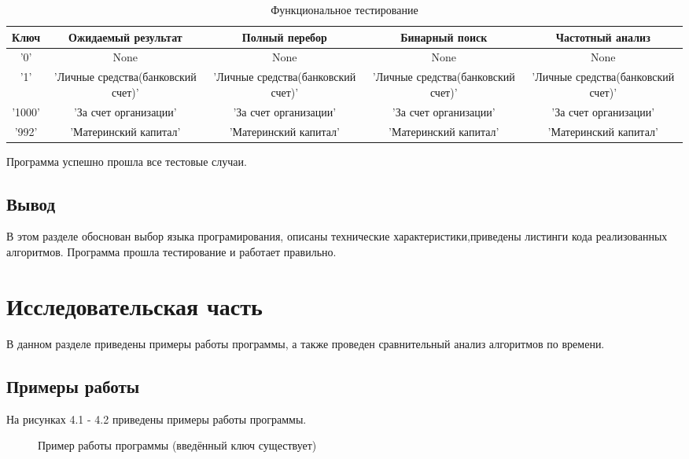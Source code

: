\documentclass[12pt]{report}
\begin{document}
\newpage
\begin{table}
	\caption{Функциональное тестирование}
	\label{tab1}
		\begin{tabular*}{1.75\textwidth}{| c | c | c |c  |c|}
			\hline
			\textbf{Ключ} & \textbf{Ожидаемый результат} & \textbf{Полный перебор} & \textbf{Бинарный поиск} & \textbf{Частотный анализ} \\ \hline
			'0' & 
			None &
			None &
			None &
			None  \\ \hline
			
			'1' & 
			{'Личные средства(банковский счет)'} &
			{'Личные средства(банковский счет)'} &
			{'Личные средства(банковский счет)'} &
			{'Личные средства(банковский счет)'}  \\ \hline	
			
			'1000' &
			{'За счет организации'} &
			{'За счет организации'} &
			{'За счет организации'} &
			{'За счет организации'}  \\ \hline	
			
			'992' &
			{'Материнский капитал'} &
			{'Материнский капитал'} &
			{'Материнский капитал'} &
			{'Материнский капитал'}  \\ \hline	
			
		\end{tabular*}	
		\hfill
		
\end{table}	

Программа успешно прошла все тестовые случаи.

\section{Вывод}
В этом разделе обоснован выбор языка програмирования, описаны технические характеристики,приведены листинги кода реализованных алгоритмов. Программа прошла тестирование и работает правильно.

\chapter{Исследовательская часть}

В данном разделе приведены примеры работы программы, а также проведен сравнительный анализ алгоритмов по времени.
\section{Примеры работы}
На рисунках 4.1 - 4.2 приведены примеры работы программы. 

\begin{figure}[ht!]
	\caption{Пример работы программы (введённый ключ существует)}
\end{figure}
\end{document}
